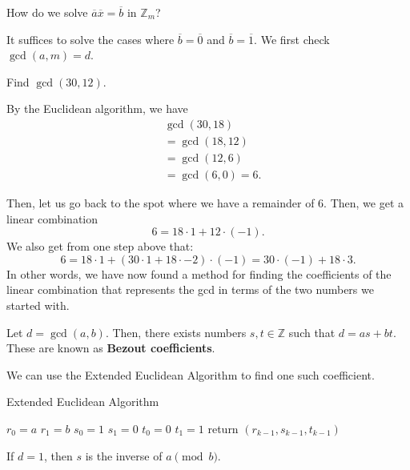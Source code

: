 
How do we solve \( \overline{a}\overline{x}=\overline{b}    \) in \( \mathbb{Z}_m \)?

It suffices to solve the cases where \( \overline{b}=\overline{0}   \) and \( \overline{b}=\overline{1}   \). We first check \( \gcd(a,m)=d \).

\begin{eg}
	Find \( \gcd(30,12) \).
\end{eg}

By the Euclidean algorithm, we have
\begin{align*}
	& \gcd(30, 18) \tag{\( 30=18\cdot 1 + 12 \)} \\
	&= \gcd(18, 12) \tag{\( 18=12\cdot 1 + 6 \)} \\
	&= \gcd(12, 6) \tag{\( 12=6\cdot 2 + 0 \)} \\
	&= \gcd(6,0) = 6
.\end{align*}

Then, let us go back to the spot where we have a remainder of 6. Then, we get a linear combination \[
	6 = 18 \cdot 1 + 12 \cdot (-1)
.\] We also get from one step above that: \[
	6 = 18 \cdot 1 + (30 \cdot 1 + 18 \cdot -2) \cdot (-1) = 30 \cdot (-1) + 18 \cdot 3
.\] In other words, we have now found a method for finding the coefficients of the linear combination that represents the gcd in terms of the two numbers we started with. 

\begin{definition}	
	Let \( d=\gcd(a,b) \). Then, there exists numbers \( s,t \in \mathbb{Z} \) such that \( d=as+bt \). These are known as \textbf{Bezout coefficients}.
\end{definition}

We can use the Extended Euclidean Algorithm to find one such coefficient.

\begin{algorithm}
	\caption{Extended Euclidean Algorithm}
	\( r_0=a \)\;
	\( r_1=b \)\;
	\( s_0=1 \)\;
	\( s_1=0 \)\;
	\( t_0=0 \)\;
	\( t_1=1 \)\;
	return \( (r_{k-1}, s_{k-1}, t_{k-1}) \)\;
\end{algorithm}

\begin{remark}
	If \( d=1 \), then \( s \) is the inverse of \( a \pmod b \).
\end{remark}

